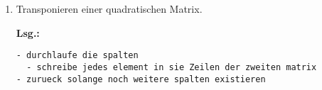 \documentclass[12pt,a4paper,ngerman]{scrreprt}
\newcommand{\Lsg}{\par \textbf{Lsg.: } \hfill}
\begin{document}
\begin{enumerate}
\begin{enumerate}
\item Transponieren einer quadratischen Matrix.

\Lsg

\begin{lstlisting}
- durchlaufe die spalten
  - schreibe jedes element in sie Zeilen der zweiten matrix
- zurueck solange noch weitere spalten existieren
\end{lstlisting}

\begin{comment}
\begin{flushleft}
\begin{struktogramm}(95,40)[Programmname]
\while{\( test \)}test
\whileend
\case[10]{3}{3}{Signum(x)}{-1}
	\assign{\(z \gets - \frac{1}{x}\)}
\switch{0}
	\assign{Ausgabe: Division durch 0}
\switch[r]{1}
	\assign{\(z \gets \frac{1}{x}\)}
\caseend
\end{struktogramm}
\end{flushleft}
\end{comment}


\end{enumerate}

\end{enumerate}
\end{document}
